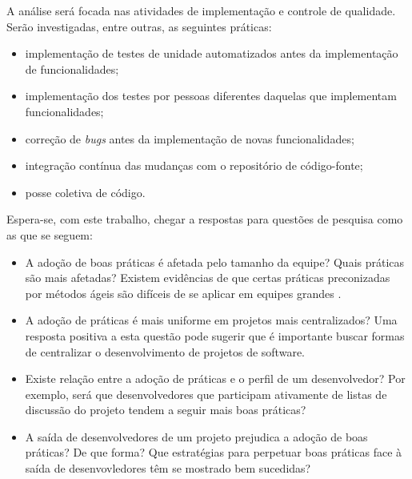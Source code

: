 \documentclass{article}
\begin{document}
A análise será focada nas atividades de implementação e controle de qualidade.
Serão investigadas, entre outras, as seguintes práticas:
\begin{itemize}
  \item implementação de testes de unidade automatizados antes da implementação
  de funcionalidades;
  \item implementação dos testes por pessoas diferentes daquelas que
  implementam funcionalidades;
  \item correção de \emph{bugs} antes da implementação de novas funcionalidades;
  \item integração contínua das mudanças com o repositório de código-fonte;
  \item posse coletiva de código.
\end{itemize}

Espera-se, com este trabalho, chegar a respostas para questões de pesquisa
como as que se seguem:

\begin{itemize}
  \item A adoção de boas práticas é afetada pelo tamanho da equipe? Quais
práticas são mais afetadas? Existem evidências de que certas práticas
preconizadas por métodos ágeis são difíceis de se aplicar em equipes grandes
\cite{nerur2005}.
  \item A adoção de práticas é mais uniforme em projetos mais centralizados? Uma
resposta positiva a esta questão pode sugerir que é importante buscar formas de
centralizar o desenvolvimento de projetos de software.
  \item Existe relação entre a adoção de práticas e o perfil de um
desenvolvedor? Por exemplo, será que desenvolvedores que participam ativamente
de listas de discussão do projeto tendem a seguir mais boas práticas?
  \item A saída de desenvolvedores de um projeto prejudica a adoção de boas
práticas? De que forma? Que estratégias para perpetuar boas práticas face à
saída de desenvovledores têm se mostrado bem sucedidas?
\end{itemize}

\end{document}
